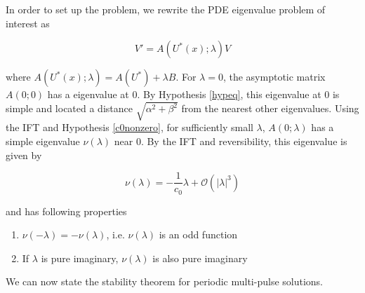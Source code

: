\documentclass[12pt]{article}
\begin{document}
In order to set up the problem, we rewrite the PDE eigenvalue problem of interest as

\begin{equation}\label{PDEeig3}
V' = A(U^*(x); \lambda)V 
\end{equation} 

where $A(U^*(x); \lambda) = A(U^*) + \lambda B$. For $\lambda = 0$, the asymptotic matrix $A(0; 0)$ has a eigenvalue at 0. By Hypothesis \ref{hypeq}, this eigenvalue at 0 is simple and located a distance $\sqrt{\alpha^2 + \beta^2}$ from the nearest other eigenvalues. Using the IFT and Hypothesis \ref{c0nonzero}, for sufficiently small $\lambda$, $A(0; \lambda)$ has a simple eigenvalue $\nu(\lambda)$ near 0. By the IFT and reversibility, this eigenvalue is given by

\begin{equation}\label{nulambda}
\nu(\lambda) = -\frac{1}{c_0} \lambda + \mathcal{O}(|\lambda|^3)
\end{equation}

and has following properties

\begin{enumerate}
\item $\nu(-\lambda) = -\nu(\lambda)$, i.e. $\nu(\lambda)$ is an odd function 
\item If $\lambda$ is pure imaginary, $\nu(\lambda)$ is also pure imaginary
\end{enumerate}

We can now state the stability theorem for periodic multi-pulse solutions. 
\end{document}
